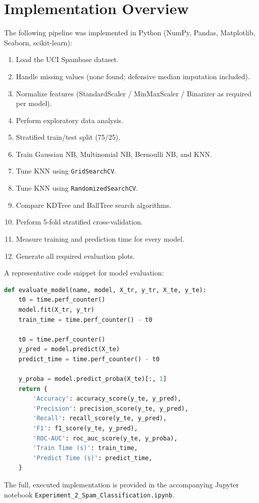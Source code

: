 \documentclass[11pt]{article}
\begin{document}
\section{Implementation Overview}
The following pipeline was implemented in Python (NumPy, Pandas, Matplotlib, Seaborn,
scikit-learn):
\begin{enumerate}
    \item Load the UCI Spambase dataset.
    \item Handle missing values (none found; defensive median imputation included).
    \item Normalize features (StandardScaler / MinMaxScaler / Binarizer as required per model).
    \item Perform exploratory data analysis.
    \item Stratified train/test split (75/25).
    \item Train Gaussian NB, Multinomial NB, Bernoulli NB, and KNN.
    \item Tune KNN using \texttt{GridSearchCV}.
    \item Tune KNN using \texttt{RandomizedSearchCV}.
    \item Compare KDTree and BallTree search algorithms.
    \item Perform 5-fold stratified cross-validation.
    \item Measure training and prediction time for every model.
    \item Generate all required evaluation plots.
\end{enumerate}

A representative code snippet for model evaluation:
\begin{lstlisting}[language=Python]
def evaluate_model(name, model, X_tr, y_tr, X_te, y_te):
    t0 = time.perf_counter()
    model.fit(X_tr, y_tr)
    train_time = time.perf_counter() - t0

    t0 = time.perf_counter()
    y_pred = model.predict(X_te)
    predict_time = time.perf_counter() - t0

    y_proba = model.predict_proba(X_te)[:, 1]
    return {
        'Accuracy': accuracy_score(y_te, y_pred),
        'Precision': precision_score(y_te, y_pred),
        'Recall': recall_score(y_te, y_pred),
        'F1': f1_score(y_te, y_pred),
        'ROC-AUC': roc_auc_score(y_te, y_proba),
        'Train Time (s)': train_time,
        'Predict Time (s)': predict_time,
    }
\end{lstlisting}
The full, executed implementation is provided in the accompanying Jupyter notebook
\texttt{Experiment\_2\_Spam\_Classification.ipynb}.
\end{document}
